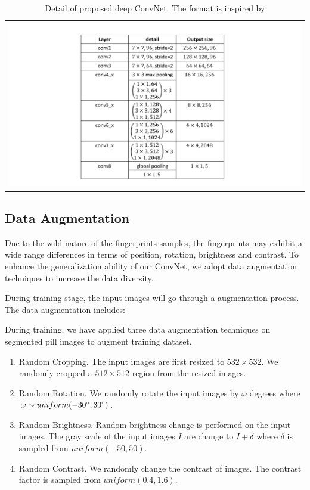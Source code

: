 \begin{table}[!ht]
	\centering
	\caption{Detail of proposed deep ConvNet. The format is inspired by \cite{he2016deep}}
	\label{tab.cnn_params}
	\begin{tabular}{l}
		\includegraphics[scale=0.45,clip=true,trim = 78mm 5mm 70mm 5mm]{fig/figs/cnn_table.pdf}
	\end{tabular}
\end{table}


\subsection{Data Augmentation}
Due to the wild nature of the fingerprints samples, the fingerprints may exhibit a wide range differences in terms of position, rotation, brightness and contrast. To enhance the generalization ability of our ConvNet, we adopt data augmentation techniques to increase the data diversity.

During training stage, the input images will go through a augmentation process.
%
The data augmentation includes:
	
During training, we have applied three data augmentation techniques on segmented pill images to augment training dataset. 

\begin{enumerate}

	\item Random Cropping. The input images are first resized to $532 \times 532$. We randomly cropped a $512\times512$ region from the resized images.
	\item Random Rotation. We randomly rotate the input images by $\omega$ degrees where $\omega \sim uniform (-30\degree, 30\degree)$.
	\item Random Brightness.  Random brightness change is performed on the input images. The gray scale of the input images $I$ are change to $I + \delta$ where $\delta$ is  sampled from $uniform (-50, 50)$.
	\item Random Contrast. We randomly change the contrast of images. The contrast factor is sampled from $uniform (0.4, 1.6)$.

\end{enumerate}

